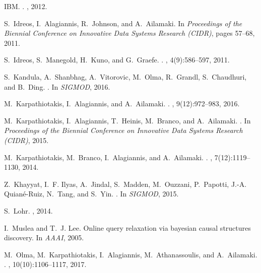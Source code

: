 IBM.
.
, 2012.

S.~Idreos, I.~Alagiannis, R.~Johnson, and A.~Ailamaki.
\newblock In {\em Proceedings of the Biennial Conference on Innovative Data
  Systems Research (CIDR)}, pages 57--68, 2011.

S.~Idreos, S.~Manegold, H.~Kuno, and G.~Graefe.
.
, 4(9):586--597, 2011.

S.~Kandula, A.~Shanbhag, A.~Vitorovic, M.~Olma, R.~Grandl, S.~Chaudhuri, and
  B.~Ding.
.
\newblock In {\em SIGMOD}, 2016.

M.~Karpathiotakis, I.~Alagiannis, and A.~Ailamaki.
.
, 9(12):972--983, 2016.

M.~Karpathiotakis, I.~Alagiannis, T.~Heinis, M.~Branco, and A.~Ailamaki.
.
\newblock In {\em Proceedings of the Biennial Conference on Innovative Data
  Systems Research (CIDR)}, 2015.

M.~Karpathiotakis, M.~Branco, I.~Alagiannis, and A.~Ailamaki.
.
, 7(12):1119--1130, 2014.

Z.~Khayyat, I.~F. Ilyas, A.~Jindal, S.~Madden, M.~Ouzzani, P.~Papotti, J.-A.
  Quian{\'e}-Ruiz, N.~Tang, and S.~Yin.
.
\newblock In {\em {SIGMOD}}, 2015.

S.~Lohr.
, 2014.

I.~Muslea and T.~J. Lee.
\newblock Online query relaxation via bayesian causal structures discovery.
\newblock In {\em AAAI}, 2005.

M.~Olma, M.~Karpathiotakis, I.~Alagiannis, M.~Athanassoulis, and A.~Ailamaki.
.
, 10(10):1106--1117, 2017.

